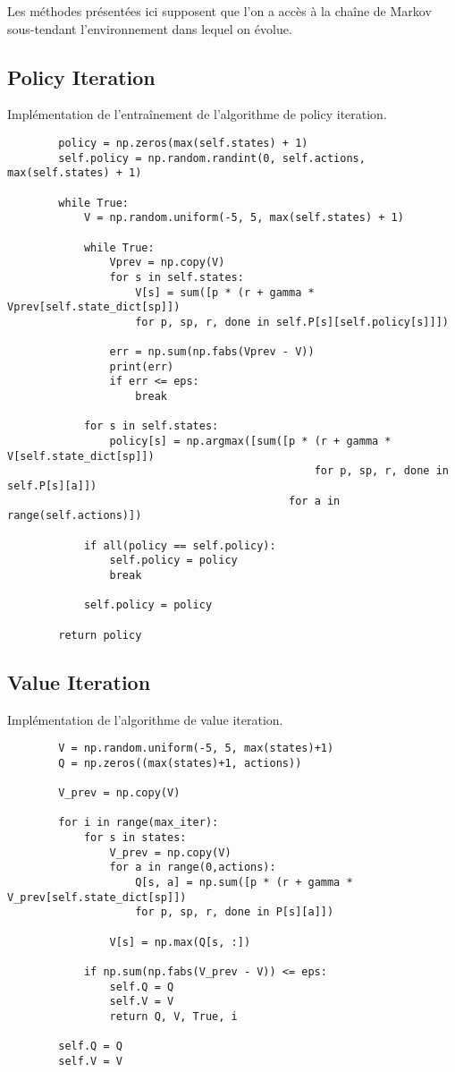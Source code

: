 \documentclass{standalone}
\begin{document}
Les méthodes présentées ici supposent que l'on a accès à la chaîne de Markov sous-tendant l'environnement dans lequel on évolue.

\subsection{Policy Iteration}

Implémentation de l'entraînement de l'algorithme de policy iteration.

\begin{verbatim}
        policy = np.zeros(max(self.states) + 1)
        self.policy = np.random.randint(0, self.actions, max(self.states) + 1)

        while True:
            V = np.random.uniform(-5, 5, max(self.states) + 1)

            while True:
                Vprev = np.copy(V)
                for s in self.states:
                    V[s] = sum([p * (r + gamma * Vprev[self.state_dict[sp]]) 
		    		for p, sp, r, done in self.P[s][self.policy[s]]])

                err = np.sum(np.fabs(Vprev - V))
                print(err)
                if err <= eps:
                    break

            for s in self.states:
                policy[s] = np.argmax([sum([p * (r + gamma * V[self.state_dict[sp]])
                                                for p, sp, r, done in self.P[s][a]])
                                            for a in range(self.actions)])

            if all(policy == self.policy):
                self.policy = policy
                break

            self.policy = policy

        return policy
\end{verbatim}

\subsection{Value Iteration}

Implémentation de l'algorithme de value iteration.

\begin{verbatim}
        V = np.random.uniform(-5, 5, max(states)+1)
        Q = np.zeros((max(states)+1, actions))

        V_prev = np.copy(V)

        for i in range(max_iter):
            for s in states:
                V_prev = np.copy(V)
                for a in range(0,actions):
                    Q[s, a] = np.sum([p * (r + gamma * V_prev[self.state_dict[sp]]) 
		    		for p, sp, r, done in P[s][a]])

                V[s] = np.max(Q[s, :])

            if np.sum(np.fabs(V_prev - V)) <= eps:
                self.Q = Q
                self.V = V
                return Q, V, True, i

        self.Q = Q
        self.V = V
\end{verbatim}
\end{document}
